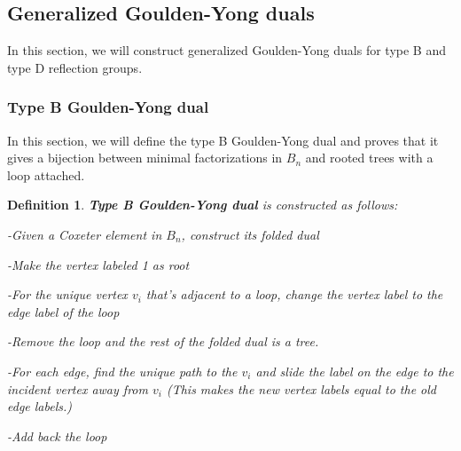 \documentclass[11pt]{amsart}
\newtheorem{defi}[thm]{Definition}%
\begin{document}
\subsection{Generalized Goulden-Yong duals}
In this section, we will construct generalized Goulden-Yong duals for type B and type D reflection groups.

\subsubsection{Type B Goulden-Yong dual}
In this section, we will define the type B Goulden-Yong dual and proves that it gives a bijection between minimal factorizations in $B_n$ and rooted trees with a loop attached.

\begin{defi}
    \textbf{Type B Goulden-Yong dual} is constructed as follows:
    
    -Given a Coxeter element in $B_n$, construct its folded dual

    -Make the vertex labeled 1 as root

    -For the unique vertex $v_i$ that's adjacent to a loop, change the vertex label to the edge label of the loop

    -Remove the loop and the rest of the folded dual is a tree.

    -For each edge, find the unique path to the $v_i$ and slide the label on the edge to the incident vertex away from $v_i$ (This makes the new vertex labels equal to the old edge labels.)

    -Add back the loop
\end{defi}
\end{document}

